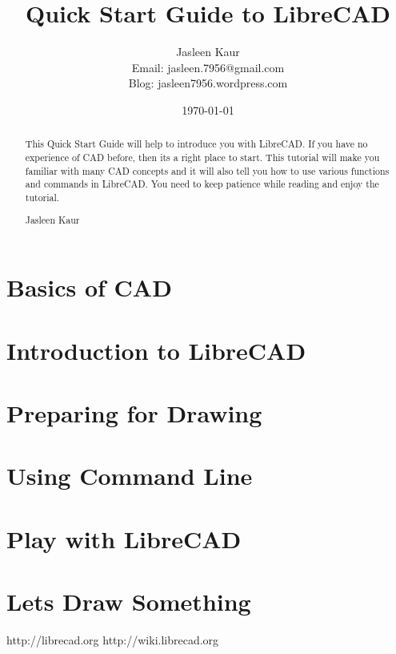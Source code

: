 \documentclass[titlepage]{article}
\title{Quick Start Guide to LibreCAD}
\author{Jasleen Kaur\\
Email: jasleen.7956@gmail.com\\
Blog: jasleen7956.wordpress.com}
\date{\today}
\begin{document}
\maketitle 
    \begin{abstract}
    This Quick Start Guide will help to introduce you with LibreCAD. If you have
    no experience of CAD before, then its a right place to start. This tutorial will make you familiar with many CAD concepts and it will also tell you how to use various functions and commands in LibreCAD. You need to keep
   patience while reading and enjoy the tutorial.
       \begin{flushright}
       Jasleen Kaur
       \end{flushright}
    \end{abstract}
\tableofcontents
\newpage

\section{\textbf{Basics of CAD}}

%
\newpage
\section{{Introduction to LibreCAD}}

%
\newpage
\section{Preparing for Drawing}

%
\newpage
\section{Using Command Line} \vspace{.1in}

%
\newpage
\section{Play with LibreCAD} 

\newpage
\section{Lets Draw Something}

\newpage
    \begin{thebibliography}{5}
     http://librecad.org
     http://wiki.librecad.org
    \end{thebibliography}
\end{document}
